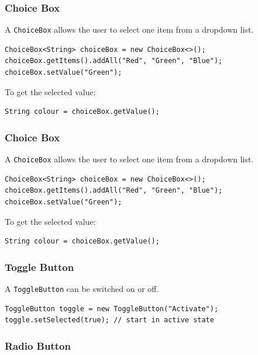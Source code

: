 \documentclass{article}
\newcommand{\codecmd}[1]{\textcolor[rgb]{0,0.5,0}{\texttt{#1}}}
\begin{document}
\subsubsection{Choice Box}

A \codecmd{ChoiceBox} allows the user to select one item from a dropdown list.

\begin{verbatim}
ChoiceBox<String> choiceBox = new ChoiceBox<>();
choiceBox.getItems().addAll("Red", "Green", "Blue");
choiceBox.setValue("Green");
\end{verbatim}

\noindent To get the selected value:
\begin{verbatim}
String colour = choiceBox.getValue();
\end{verbatim}

\subsubsection{Choice Box}

A \codecmd{ChoiceBox} allows the user to select one item from a dropdown list.

\begin{verbatim}
ChoiceBox<String> choiceBox = new ChoiceBox<>();
choiceBox.getItems().addAll("Red", "Green", "Blue");
choiceBox.setValue("Green");
\end{verbatim}

\noindent To get the selected value:
\begin{verbatim}
String colour = choiceBox.getValue();
\end{verbatim}

\subsubsection{Toggle Button}

A \codecmd{ToggleButton} can be switched on or off.

\begin{verbatim}
ToggleButton toggle = new ToggleButton("Activate");
toggle.setSelected(true); // start in active state
\end{verbatim}

\subsubsection{Radio Button}
\end{document}
